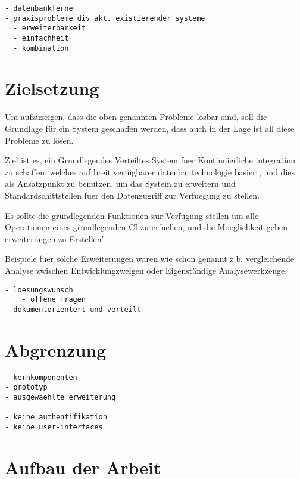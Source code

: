 \begin{verbatim}
- datenbankferne
- praxisprobleme div akt. existierender systeme
  - erweiterbarkeit
  - einfachheit
  - kombination

\end{verbatim}

\section{Zielsetzung}

Um aufzuzeigen, dass die oben genannten Probleme lösbar sind,
soll die Grundlage für ein System geschaffen werden,
dass auch in der Lage ist all diese Probleme zu lösen.

Ziel ist es, ein Grundlegendes Verteiltes System fuer Kontinuierliche integration zu schaffen,
welches auf breit verfügbarer datenbantechnologie basiert,
und dies als Ansatzpunkt zu benutzen,
um das System zu erweitern und Standardschittstellen fuer den Datenzugriff zur Verfuegung zu stellen.

Es sollte die grundlegenden Funktionen zur Verfügung stellen um alle Operationen
eines grundlegenden CI zu erfuellen,
und die Moeglichkeit geben erweiterungen zu Erstellen'

Beispiele fuer solche Erweiterungen wären wie schon genannt
z.b. vergleichende Analyse zwischen Entwicklungzweigen oder Eigenständige Analysewerkzeuge.

\begin{verbatim}
- loesungswunsch
    - offene fragen
- dokumentorientert und verteilt
\end{verbatim}

\section{Abgrenzung}

\begin{verbatim}
- kernkomponenten
- prototyp
- ausgewaehlte erweiterung

- keine authentifikation
- keine user-interfaces

\end{verbatim}

\section{Aufbau der Arbeit}



